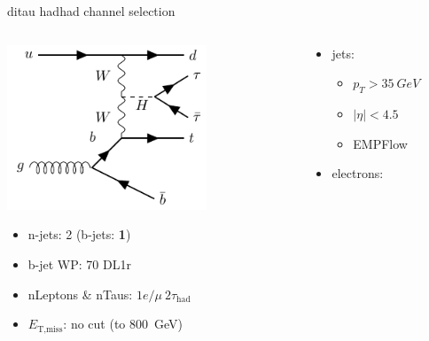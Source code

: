 \begin{frame}{\tHq ditau hadhad channel selection}
  \begin{columns}
    \begin{column}{0.5\textwidth}
      \centering \includegraphics[width=0.7\textwidth]{tHq_tautau}\\
      \begin{itemize}
        \item n-jets: 2 (b-jets: \textbf{1})
        \item b-jet WP: 70 DL1r
        \item nLeptons \& nTaus: \bf{$1e / \mu~2\tau_{\text{had}}$}
        \item $E_{\text{T,miss}}$: no cut (to \SI{800}{GeV})
      \end{itemize}
    \end{column}
    \begin{column}{0.7\textwidth}
      \vspace*{-0.05\textwidth}
      \begin{itemize}
        \footnotesize
        \item jets:
        \vspace*{-0.02\textwidth}
        \begin{itemize}
          \footnotesize
          \item $p_T>\SI{35}{GeV}$
          \item $|\eta|<4.5$
          \item EMPFlow
        \end{itemize}
        \item electrons:
        \vspace*{-0.02\textwidth}

\end{itemize}
\end{column}
\end{columns}
\end{frame}

